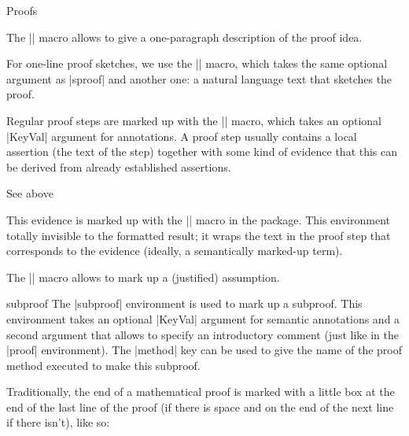 \begin{sfragment}{Proofs}
\begin{function}{\spfidea}
  The |\spfidea| macro allows to give a one-paragraph description of the proof idea.
\end{function}

\begin{function}{\spfsketch}
  For one-line proof sketches, we use the |\spfsketch| macro, which takes the same
  optional argument as |sproof| and another one: a natural language text that sketches
  the proof.
\end{function}

\begin{function}{\spfstep}
  Regular proof steps are marked up with the |\spfstep| macro, which takes an optional
  |KeyVal| argument for annotations. A proof step usually contains a local assertion
  (the text of the step) together with some kind of evidence that this can be derived
  from already established assertions.
\end{function}

\begin{function}{\yield}
  See above
\end{function}

\begin{function}{\spfjust}
  This evidence is marked up with the |\spfjust| macro in the 
  package. This environment totally invisible to the formatted result; it wraps the text
  in the proof step that corresponds to the evidence (ideally, a
  semantically marked-up term).
\end{function}

\begin{function}{\assumption}
  The |\assumption| macro allows to mark up a (justified) assumption.
\end{function}

\begin{function}{\justarg}
\end{function}

\begin{environment}{subproof}
  The |subproof| environment is used to mark up a subproof. This environment takes an
  optional |KeyVal| argument for semantic annotations and a second argument that allows
  to specify an introductory comment (just like in the |proof| environment). The
  |method| key can be used to give the name of the proof method
  executed to make this subproof.
\end{environment}

\begin{function}{\sproofend}
  Traditionally, the end of a mathematical proof is marked with a little box at the end of
  the last line of the proof (if there is space and on the end of the next line if there
  isn't), like so:\sproofend


\end{function}
\end{sfragment}
